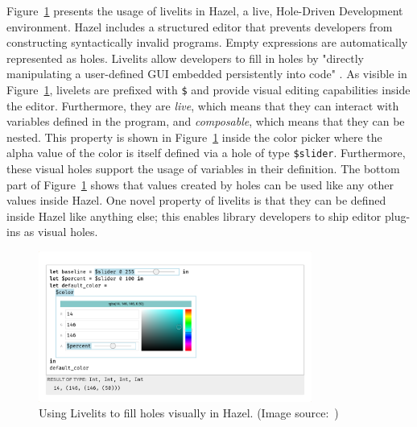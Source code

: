 Figure~\ref{fig:hazel-livelits} presents the usage of livelits in Hazel, a live, Hole-Driven Development environment.
Hazel includes a structured editor that prevents developers from constructing syntactically invalid programs.
Empty expressions are automatically represented as holes.
Livelits allow developers to fill in holes by "directly manipulating a user-defined GUI embedded persistently into code" \cite{omar_filling_2021}.
As visible in Figure~\ref{fig:hazel-livelits}, livelets are prefixed with \verb|$| and provide visual editing capabilities inside the editor.
Furthermore, they are \emph{live}, which means that they can interact with variables defined in the program, and \emph{composable}, which means that they can be nested.
This property is shown in Figure~\ref{fig:hazel-livelits} inside the color picker where the alpha value of the color is itself defined via a hole of type \verb|$slider|.
Furthermore, these visual holes support the usage of variables in their definition.
The bottom part of Figure~\ref{fig:hazel-livelits} shows that values created by holes can be used like any other values inside Hazel.
One novel property of livelits is that they can be defined inside Hazel like anything else; this enables library developers to ship editor plug-ins as visual holes. 

\begin{figure}
    \centering
    \includegraphics[width=0.8\textwidth]{images/hazel}
    \caption{Using Livelits to fill holes visually in Hazel. (Image source:~\cite{omar_filling_2021})}
    \label{fig:hazel-livelits}
\end{figure}


